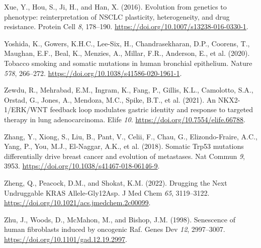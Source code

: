 \begin{CSLReferences}{0}{0}
\leavevmode{}%
Xue, Y., Hou, S., Ji, H., and Han, X. (2016). Evolution from genetics to phenotype: reinterpretation of NSCLC plasticity, heterogeneity, and drug resistance. Protein Cell \emph{8}, 178--190. \url{https://doi.org/10.1007/s13238-016-0330-1}.

\leavevmode{}%
Yoshida, K., Gowers, K.H.C., Lee-Six, H., Chandrasekharan, D.P., Coorens, T., Maughan, E.F., Beal, K., Menzies, A., Millar, F.R., Anderson, E., et al. (2020). Tobacco smoking and somatic mutations in human bronchial epithelium. Nature \emph{578}, 266--272. \url{https://doi.org/10.1038/s41586-020-1961-1}.

\leavevmode{}%
Zewdu, R., Mehrabad, E.M., Ingram, K., Fang, P., Gillis, K.L., Camolotto, S.A., Orstad, G., Jones, A., Mendoza, M.C., Spike, B.T., et al. (2021). An NKX2-1/ERK/WNT feedback loop modulates gastric identity and response to targeted therapy in lung adenocarcinoma. Elife \emph{10}. \url{https://doi.org/10.7554/elife.66788}.

\leavevmode{}%
Zhang, Y., Xiong, S., Liu, B., Pant, V., Celii, F., Chau, G., Elizondo-Fraire, A.C., Yang, P., You, M.J., El-Naggar, A.K., et al. (2018). Somatic Trp53 mutations differentially drive breast cancer and evolution of metastases. Nat Commun \emph{9}, 3953. \url{https://doi.org/10.1038/s41467-018-06146-9}.

\leavevmode{}%
Zheng, Q., Peacock, D.M., and Shokat, K.M. (2022). Drugging the Next Undruggable KRAS Allele-Gly12Asp. J Med Chem \emph{65}, 3119--3122. \url{https://doi.org/10.1021/acs.jmedchem.2c00099}.

\leavevmode{}%
Zhu, J., Woods, D., McMahon, M., and Bishop, J.M. (1998). Senescence of human fibroblasts induced by oncogenic Raf. Genes Dev \emph{12}, 2997--3007. \url{https://doi.org/10.1101/gad.12.19.2997}.

\end{CSLReferences}

